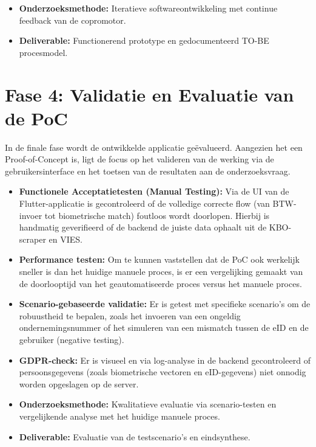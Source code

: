 \begin{itemize}
    \item \textbf{Onderzoeksmethode:} Iteratieve softwareontwikkeling met continue feedback van de copromotor.
    \item \textbf{Deliverable:} Functionerend prototype en gedocumenteerd TO-BE procesmodel.
\end{itemize}

\section{Fase 4: Validatie en Evaluatie van de PoC}
In de finale fase wordt de ontwikkelde applicatie geëvalueerd. 
Aangezien het een Proof-of-Concept is, ligt de focus op het valideren van de werking via de gebruikersinterface 
en het toetsen van de resultaten aan de onderzoeksvraag.

\begin{itemize}
    \item \textbf{Functionele Acceptatietesten (Manual Testing):} Via de UI van de Flutter-applicatie is gecontroleerd of de volledige correcte flow (van BTW-invoer tot biometrische match) foutloos wordt doorlopen. 
    Hierbij is handmatig geverifieerd of de backend de juiste data ophaalt uit de KBO-scraper en VIES.
    \item \textbf{Performance testen:} Om te kunnen vaststellen dat de PoC ook werkelijk sneller is dan het huidige manuele proces, is er een vergelijking gemaakt van de doorlooptijd van het geautomatiseerde proces versus het manuele proces.
    \item \textbf{Scenario-gebaseerde validatie:} Er is getest met specifieke scenario's om de robuustheid te bepalen, 
    zoals het invoeren van een ongeldig ondernemingsnummer of het simuleren van een mismatch tussen de eID en de gebruiker (negative testing).
    \item \textbf{GDPR-check:} Er is visueel en via log-analyse in de backend gecontroleerd of persoonsgegevens (zoals biometrische vectoren en eID-gegevens) 
    niet onnodig worden opgeslagen op de server.
\end{itemize}

\begin{itemize}
    \item \textbf{Onderzoeksmethode:} Kwalitatieve evaluatie via scenario-testen en vergelijkende analyse met het huidige manuele proces.
    \item \textbf{Deliverable:} Evaluatie van de testscenario's en eindsynthese.
\end{itemize}


